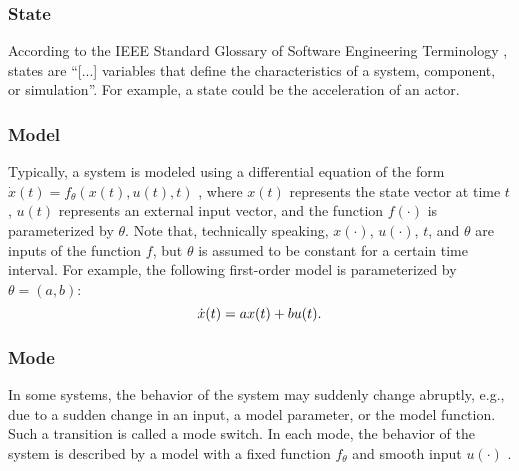 \subsubsection{State}
\label{sec:state}
According to the IEEE Standard Glossary of Software Engineering Terminology \cite{ieee1990glossary}, states are ``[...] variables that define the characteristics of a system, component, or simulation''. For example, a state could be the acceleration of an actor.

\subsubsection{Model}
\label{sec:model}
Typically, a system is modeled using a differential equation of the form $\dot{x}(t)=f_{\theta}(x(t), u(t), t)$ \cite{norman2011control}, where $x(t)$ represents the state vector at time $t$, $u(t)$ represents an external input vector, and the function $f(\cdot)$ is parameterized by $\theta$. \cbstart Note that, technically speaking, $x(\cdot)$, $u(\cdot)$, $t$, and $\theta$ are inputs of the function $f$, but $\theta$ is assumed to be constant for a certain time interval. For example, the following first-order model is parameterized by $\theta=(a,b)$:
\begin{equation}
	\dot{x}(t) = a x(t) + b u(t).
\end{equation}
\cbend


\subsubsection{Mode}
\label{sec:mode}
In some systems, the behavior of the system may suddenly change abruptly, e.g., due to a sudden change in an input, a model parameter, or the model function. Such a transition is called a mode switch.
In each mode, the behavior of the system is described by a model with a fixed function $f_{\theta}$ and smooth input $u(\cdot)$ \cite{deschutter2000optimal}.

